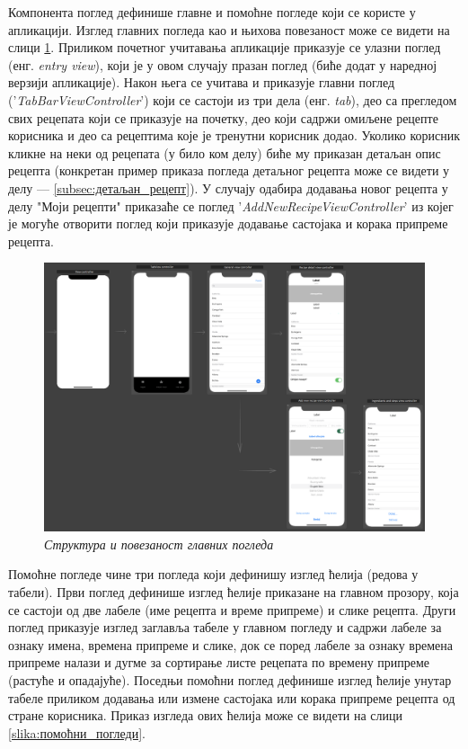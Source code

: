 \documentclass[12pt,oneside]{memoir}
\begin{document}
Компонента поглед дефинише главне и помоћне погледе који се користе у апликацији. Изглед главних погледа као и њихова повезаност може се видети на слици \ref{slika:главни_погледи}. Приликом почетног учитавања апликације приказује се улазни поглед (енг. \textit{entry view}), који је у овом случају празан поглед (биће додат у наредној верзији апликације). Након њега се учитава и приказује главни поглед ('\textit{TabBarViewController}') који се састоји из три дела (енг. \textit{tab}), део са прегледом свих рецепата који се приказује на почетку, део који садржи омиљене рецепте корисника и део са рецептима које је тренутни корисник додао. Уколико корисник кликне на неки од рецепата (у било ком делу) биће му приказан детаљан опис рецепта (конкретан пример приказа погледа детаљног рецепта може се видети у делу  --- \ref{subsec:детаљан_рецепт}). У случају одабира додавања новог рецепта у делу "Моји рецепти" приказаће се поглед '\textit{AddNewRecipeViewController}' из којег је могуће отворити поглед који приказује додавање састојака и корака припреме рецепта.

\begin{figure} [H]
    \centering
    \captionsetup{justification=centering}
    \includegraphics[width=1\textwidth]{images/view_structure.png} 
    \caption{\textit{Структура и повезаност главних погледа}}
    \label{slika:главни_погледи}
\end{figure}

Помоћне погледе чине три погледа који дефинишу изглед ћелија (редова у табели). Први поглед дефинише изглед ћелије приказане на главном прозору, која се састоји од две лабеле (име рецепта и време припреме) и слике рецепта. Други поглед приказује изглед заглавља табеле у главном погледу и садржи лабеле за ознаку имена, времена припреме и слике, док се поред лабеле за ознаку времена припреме налази и дугме за сортирање листе рецепата по времену припреме (растуће и опадајуће). Поседњи помоћни поглед дефинише изглед ћелије унутар табеле приликом додавања или измене састојака или корака припреме рецепта од стране корисника. Приказ изгледа ових ћелија може се видети на слици \ref{slika:помоћни_погледи}.
\end{document}
